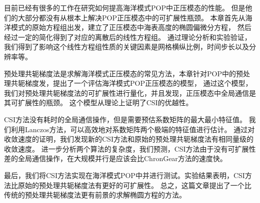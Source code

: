 目前已经有很多的工作在研究如何提高海洋模式POP中正压模态的性能。 
但是他们的大部分都没有从根本上解决POP正压模态中的可扩展性瓶颈。 
本章首先从海洋模式的原始方程组出发，建立了正压模态中海表高度的椭圆偏微分方程，
然后经过一定的简化得到了对应的离散后的线性方程组。
通过理论分析和实验验证，我们得到了影响这个线性方程组性质的关键因素是网格横纵比例，时间步长以及分辨率等。

预处理共轭梯度法是求解海洋模式正压模态的常见方法，本章针对POP中的预处理共轭梯度发，提出了一个评估海洋模式POP正压模态的模型， 通过这个模型，我们对预处理共轭梯度法的可扩展性进行量化，并且发现，正压模态中全局通信是其可扩展性的瓶颈。
这个模型从理论上证明了CSI的优越性。 

CSI方法没有耗时的全局通信操作，但是需要预估系数矩阵的最大最小特征值。
我们利用Lanczos方法，可以高效地对系数矩阵两个极端的特征值进行估计。
通过对收敛速度的证明，我们发现新的CSI方法和原始的预处理共轭梯度法有相同量级的收敛速度。
进一步分析两个算法的复杂度，我们预测，CSI方法由于没有可扩展性差的全局通信操作，在大规模并行是应该会比ChronGear方法的速度快。

最后，我们将CSI方法实现在海洋模式POP中并进行测试。实验结果表明，CSI方法比原始的预处理共轭梯度法有更好的可扩展性。 
总之，这篇文章提出了一个比传统的预处理共轭梯度法更有前景的求解椭圆方程的方法。 


